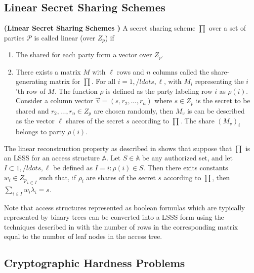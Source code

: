 \subsection*{Linear Secret Sharing Schemes}

\begin{definition}{\textbf{(Linear Secret Sharing Schemes \cite{Beimel1996}\cite{Waters2011})}}
	A secret sharing scheme $ \prod $ over a set of parties $ \mathcal{P} $ is called linear (over $ Z_{p} $) if
	\begin{enumerate}
		\item The shared for each party form a vector over $ Z_{p} $.
		
		\item There exists a matrix $ M $ with $ \ell $ rows and $ n $ columns called the share-generating matrix for $ \prod $. For all $ i = 1,/ldots,\ell $, with $ M_{i} $ representing the $i$'th row of $ M $. The function $ \rho $ is defined as the party labeling row $ i $ as $ \rho(i) $. Consider a column vector $ \vec{v} = (s, r_{2},\ldots,r_{n}) $ where $ s \in Z_{p} $ is the secret to be shared and $ r_{2},\ldots,r_{n} \in Z_{p} $ are chosen randomly, then $ M_{v} $ is can be described as the vector $ \ell $ shares of the secret $ s $ according to $ \prod $. The share $ (M_{v})_{i} $ belongs to party $ \rho(i) $.
		
	\end{enumerate}
\end{definition}

The linear reconstruction property as described in \cite{Beimel1996} shows that suppose that $ \prod $ is an LSSS for an access structure $ \mathbb{A} $. Let $ S \in \mathbb{A} $ be any authorized set, and let $ I \subset {1,/ldots,\ell} $ be defined as $ I = {i : \rho(i) \in S} $. Then there exits constants $ {w_{i} \in Z_{p}}_{i \in I} $ such that, if $ {\rho_{i}} $ are shares of the secret $ s $ according to $ \prod $, then $ \sum_{i \in I} w_{i}\lambda_{i} = s $.

Note that access structures represented as boolean formulas which are typically represented by binary trees can be converted into a LSSS form using the techniques described in \cite{Lewko2011b} with the number of rows in the corresponding matrix equal to the number of leaf nodes in the access tree.


\subsection*{Cryptographic Hardness Problems}

